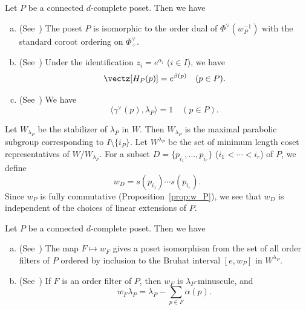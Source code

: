 \begin{prop}
\label{prop:root}
Let $P$ be a connected $d$-complete poset. Then we have
\begin{enumerate}[(a)]
\item\label{prop2.10_a} %
\textup{(See~\cite[Proposition~3.1 and Theorem~5.5]{Stem2})}
The poset $P$ is isomorphic to the order dual of $\Phi^\vee(w_P^{-1})$ 
with the standard coroot ordering on $\Phi^\vee_+$.
\item\label{prop2.10_b} %
\textup{(See~\cite[Lemma~IV]{Proc3})}
Under the identification $z_i = e^{\alpha_i}$ \textup{(}$i \in I$\textup{)}, we have
$$
\vectz[H_P(p)] = e^{\beta(p)}
\quad(p \in P).
$$
\item\label{prop2.10_c} %
\textup{(See~\cite[Proposition~5.1]{Stem2})}
We have
$$
\langle \gamma^\vee(p), \lambda_P \rangle = 1
\quad(p \in P).
$$
\end{enumerate}
\end{prop}

Let $W_{\lambda_P}$ be the stabilizer of $\lambda_P$ in $W$.
Then $W_{\lambda_P}$ is the maximal parabolic subgroup corresponding to $I \setminus \{ i_P \}$.
Let $W^{\lambda_P}$ be the set of minimum length coset representatives of $W/W_{\lambda_P}$.
For a subset $D = \{ p_{i_1}, \ldots, p_{i_r} \}$ ($i_1 < \cdots < i_r$) of $P$, we define
\begin{equation}
\label{eq:w_D}
w_D = s(p_{i_1}) \cdots s(p_{i_r}).
\end{equation}
Since $w_P$ is fully commutative (Proposition~\ref{prop:w_P}), 
we see that $w_D$ is independent of the choices of linear extensions of $P$.

\begin{prop}
\label{prop:Weyl}
Let $P$ be a connected $d$-complete poset.
Then we have
\begin{enumerate}[(a)]
\item\label{prop2.11_a} %
\textup{(See~\cite[Proposition~I]{Proc3})}
The map $F \mapsto w_F$ gives a poset isomorphism 
from the set of all order filters of $P$ ordered by inclusion 
to the Bruhat interval $[e,w_P]$ in $W^{\lambda_P}$.
\item\label{prop2.11_b} %
\textup{(See~\cite[Remark~2.7~(b)]{Stem2})}
If $F$ is an order filter of $P$, then $w_F$ is $\lambda_P$-minuscule, and
$$
w_F \lambda_P = \lambda_P - \sum_{p \in F} \alpha(p).
$$
\end{enumerate}
\end{prop}

